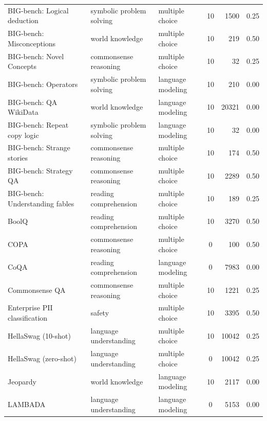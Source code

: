 \documentclass[dvipsnames,11pt]{article}
\begin{document}
\begin{appendix}
\begin{table}[t!]
\begin{tabular}{lllcrc}
BIG-bench: Logical deduction~\cite{srivastava2023beyond} & symbolic problem solving & multiple choice & 10 & 1500 & 0.25\\
BIG-bench: Misconceptions~\cite{srivastava2023beyond} & world knowledge & multiple choice & 10 & 219 & 0.50\\
BIG-bench: Novel Concepts~\cite{srivastava2023beyond} & commonsense reasoning & multiple choice & 10 & 32 & 0.25\\
BIG-bench: Operators~\cite{srivastava2023beyond} & symbolic problem solving & language modeling & 10 & 210 & 0.00\\
BIG-bench: QA WikiData~\cite{srivastava2023beyond} & world knowledge & language modeling & 10 & 20321 & 0.00\\
BIG-bench: Repeat copy logic~\cite{srivastava2023beyond} & symbolic problem solving & language modeling & 10 & 32 & 0.00\\
BIG-bench: Strange stories~\cite{srivastava2023beyond} & commonsense reasoning & multiple choice & 10 & 174 & 0.50\\
BIG-bench: Strategy QA~\cite{srivastava2023beyond} & commonsense reasoning & multiple choice & 10 & 2289 & 0.50\\
BIG-bench: Understanding fables~\cite{srivastava2023beyond} & reading comprehension & multiple choice & 10 & 189 & 0.25\\
BoolQ~\cite{boolq} & reading comprehension & multiple choice & 10 & 3270 & 0.50\\
COPA~\cite{copa} & commonsense reasoning & multiple choice & 0 & 100 & 0.50\\
CoQA~\cite{reddy-etal-2019-coqa} & reading comprehension & language modeling & 0 & 7983 & 0.00\\
Commonsense QA~\cite{talmor-etal-2019-commonsenseqa} & commonsense reasoning & multiple choice & 10 & 1221 & 0.25\\
Enterprise PII classification~\cite{pii} & safety & multiple choice & 10 & 3395 & 0.50\\
HellaSwag (10-shot)~\cite{hellaswag} & language understanding & multiple choice & 10 & 10042 & 0.25\\
HellaSwag (zero-shot)~\cite{hellaswag} & language understanding & multiple choice & 0 & 10042 & 0.25\\
Jeopardy~\cite{mosaicml} & world knowledge & language modeling & 10 & 2117 & 0.00\\
LAMBADA~\cite{lambada} & language understanding & language modeling & 0 & 5153 & 0.00\\

\end{tabular}
\end{table}
\end{appendix}
\end{document}
